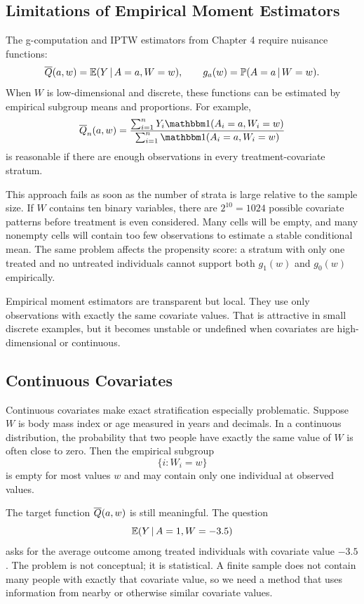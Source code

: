\label{lec:5-1}

\subsection{Limitations of Empirical Moment Estimators}

The g-computation and IPTW estimators from Chapter 4 require nuisance functions:
\[
\overline{Q}(a,w)=\mathbb{E}(Y\,\vert\, A=a,W=w),
\qquad
g_a(w)=\mathbb{P}(A=a\,\vert\, W=w).
\]
When $W$ is low-dimensional and discrete, these functions can be estimated by
empirical subgroup means and proportions. For example,
\[
\Qbar_n(a,w)=
\frac{\sum_{i=1}^nY_i\ind(A_i=a,W_i=w)}
     {\sum_{i=1}^n\ind(A_i=a,W_i=w)}
\]
is reasonable if there are enough observations in every treatment-covariate stratum.

This approach fails as soon as the number of strata is large relative to the sample
size. If $W$ contains ten binary variables, there are $2^{10}=1024$ possible covariate
patterns before treatment is even considered. Many cells will be empty, and many
nonempty cells will contain too few observations to estimate a stable conditional mean.
The same problem affects the propensity score: a stratum with only one treated and no
untreated individuals cannot support both $g_1(w)$ and $g_0(w)$ empirically.

\begin{keyidea}
Empirical moment estimators are transparent but local. They use only observations
with exactly the same covariate values. That is attractive in small discrete examples,
but it becomes unstable or undefined when covariates are high-dimensional or
continuous.
\end{keyidea}

\subsection{Continuous Covariates}

Continuous covariates make exact stratification especially problematic. Suppose $W$
is body mass index or age measured in years and decimals. In a continuous
distribution, the probability that two people have exactly the same value of $W$ is
often close to zero. Then the empirical subgroup
\[
\{i:W_i=w\}
\]
is empty for most values $w$ and may contain only one individual at observed values.

The target function $\overline{Q}(a,w)$ is still meaningful. The question
\[
\mathbb{E}(Y\,\vert\, A=1,W=-3.5)
\]
asks for the average outcome among treated individuals with covariate value $-3.5$.
The problem is not conceptual; it is statistical. A finite sample does not contain many
people with exactly that covariate value, so we need a method that uses information
from nearby or otherwise similar covariate values.

